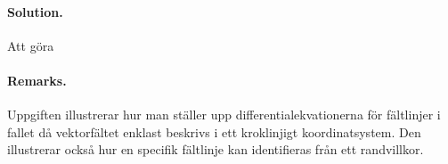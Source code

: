 \documentclass[%
oneside,                 %
final,                   %
10pt]{article}
\newenvironment{doconceexercise}{}{}
\begin{document}
\begin{doconceexercise}


\paragraph{Solution.}
Att göra



\paragraph{Remarks.}
Uppgiften illustrerar hur man ställer upp differentialekvationerna för fältlinjer i fallet då vektorfältet enklast beskrivs i ett kroklinjigt koordinatsystem. Den illustrerar också hur en specifik fältlinje kan identifieras från ett randvillkor.


\end{doconceexercise}



\end{document}

